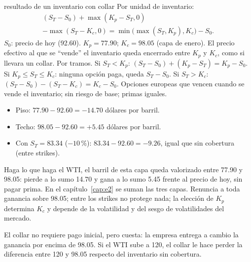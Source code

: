\begin{ficha}{resultado de un inventario con collar}
 Por unidad de inventario:
\begin{multline*}
(S_T-S_0)+\max(K_p-S_T,0)\\-\max(S_T-K_c,0)=\min\bigl(\max(S_T,K_p),K_c\bigr)-S_0.
\end{multline*}
 $S_0$: precio de hoy (92.60). $K_p=77.90$; $K_c=98.05$ (capa de enero).
 El precio efectivo al que se \enquote{vende} el inventario queda encerrado entre $K_p$ y $K_c$, como si llevara un collar.
 Por tramos. Si $S_T<K_p$: $(S_T-S_0)+(K_p-S_T)=K_p-S_0$. Si $K_p\le S_T\le K_c$: ninguna opción paga, queda $S_T-S_0$. Si $S_T>K_c$: $(S_T-S_0)-(S_T-K_c)=K_c-S_0$.
 Opciones europeas que vencen cuando se vende el inventario; sin riesgo de base; primas iguales.
\begin{itemize}
\item Piso: $77.90-92.60=-14.70$ dólares por barril.
\item Techo: $98.05-92.60=+5.45$ dólares por barril.
\item Con $S_T=83.34$ ($-10\,\%$): $83.34-92.60=-9.26$, igual que sin cobertura (entre strikes).
\end{itemize}
 Haga lo que haga el WTI, el barril de esta capa queda valorizado entre 77.90 y 98.05: pierde a lo sumo 14.70 y gana a lo sumo 5.45 frente al precio de hoy, sin pagar prima. En el capítulo~\ref{cap:e2} se suman las tres capas.
 Renuncia a toda ganancia sobre 98.05; entre los strikes no protege nada; la elección de $K_p$ determina $K_c$ y depende de la volatilidad y del sesgo de volatilidades del mercado.
\end{ficha}

\begin{cuidado}
El collar no requiere pago inicial, pero cuesta: la empresa entrega a cambio la ganancia por encima de 98.05. Si el WTI sube a 120, el collar le hace perder la diferencia entre 120 y 98.05 respecto del inventario sin cobertura.
\end{cuidado}

